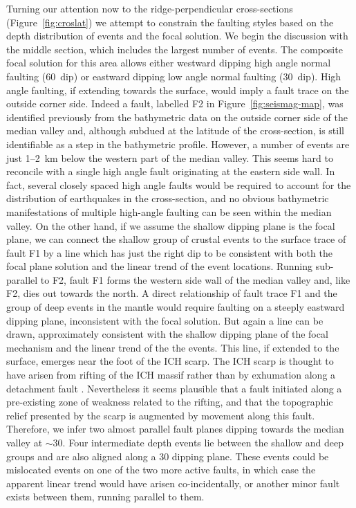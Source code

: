 \documentclass[jgr]{agu2001}
\newlength{\tw}
\begin{document}
\begin{article}
Turning our attention now to the ridge-perpendicular cross-sections
(Figure~\ref{fig:croslat}) we  attempt to constrain the faulting
styles based on the depth distribution of events and the focal solution.
We begin the discussion with the middle section, which includes the
largest number of events.  The composite focal solution for this area
allows either westward dipping high angle normal faulting (60\dg\ dip)
or eastward dipping low angle normal faulting (30\dg\ dip).  High angle
faulting, if extending towards the surface, would imply a fault trace
on the outside corner side.  Indeed a fault,
labelled F2 in Figure~\ref{fig:seismag-map}, was identified previously
from the
bathymetric data on the outside corner side of the median valley
\citep{reston02} and, although subdued at the latitude of the
cross-section, is still identifiable as a step in the bathymetric
profile. However, a number of events are just 1--2~km below the
western part of the median valley. This seems hard to reconcile with a
single high angle fault originating at the eastern side wall.  In
fact, several closely spaced high angle faults would be required to account
for the distribution of earthquakes in the cross-section, and no
obvious bathymetric manifestations of multiple high-angle faulting
can be seen within the median valley.  On the other hand, if we assume
the shallow dipping plane is the focal plane, we can connect the
shallow group of crustal events to the surface trace of fault F1
by a line which has just the right dip to be consistent with both the focal
plane solution and the linear trend of the event locations. Running
sub-parallel to F2, fault F1 forms the western side wall of the median
valley \citep{reston02} and, like F2, dies out towards the north.  A
direct relationship of fault trace F1 and the group of deep events in
the mantle would require faulting on a steeply eastward dipping
plane, inconsistent with the focal solution.  But again a line can be
drawn, approximately consistent with the shallow dipping plane of the
focal mechanism and the linear trend of the the events. This line, if
extended to the surface, emerges near the foot of the ICH scarp.  The
ICH scarp is thought to have arisen from rifting of the ICH massif
rather than by exhumation along a detachment fault
\citep{reston02}.  Nevertheless it seems plausible that a fault
initiated along a pre-existing zone of weakness related to the
rifting, and that the topographic relief presented by the scarp is
augmented by movement along this fault. Therefore, we infer two almost
parallel fault planes dipping towards the median valley at $\sim$30\dg.
Four intermediate depth events
lie between the shallow and deep groups and are also aligned along a
30{\dg} dipping plane.  These events could be mislocated events on one
of the two more active faults, in
which case the apparent linear trend would have arisen
co-incidentally, or another minor fault exists between them, running parallel to them.


\end{article}
\end{document}

